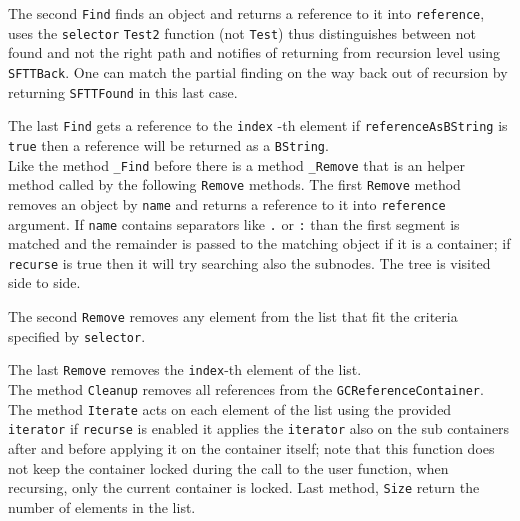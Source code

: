 The second \texttt{Find} finds an object and returns a reference to it into \texttt{reference}, uses the \texttt{selector} \texttt{Test2} function (not \texttt{Test}) thus distinguishes between not found and not the right path and notifies of returning from recursion level using \texttt{SFTTBack}. One can match the partial finding on the way back out of recursion by returning \texttt{SFTTFound} in this last case.

The last \texttt{Find} gets a reference to the \texttt{index} -th element if \texttt{referenceAsBString} is \texttt{true} then a reference will be returned as a \texttt{BString}. \\


Like the method \texttt{\_Find} before there is a method \texttt{\_Remove} that is an helper method called by the following \texttt{Remove} methods. The first \texttt{Remove} method removes an object by \texttt{name} and returns a reference to it into \texttt{reference} argument. If \texttt{name} contains separators like \texttt{.} or \texttt{:} than the first segment is matched and the remainder is passed to the matching object if it is a container; if \texttt{recurse} is true then it will try searching also the subnodes.  The tree is visited side to side.

The second \texttt{Remove} removes any element from the list that fit the criteria specified by \texttt{selector}.

The last \texttt{Remove} removes the \texttt{index}-th element of the list. \\


The method \texttt{Cleanup} removes all references from the \texttt{GCReferenceContainer}. The method \texttt{Iterate} acts on each element of the list using the provided \texttt{iterator} if \texttt{recurse} is enabled it applies the \texttt{iterator} also on the sub containers after and before applying it on the container itself; note that this function does not keep the container locked during the call to the user function, when recursing, only the current container is locked. Last method, \texttt{Size} return the number of elements in the list.

